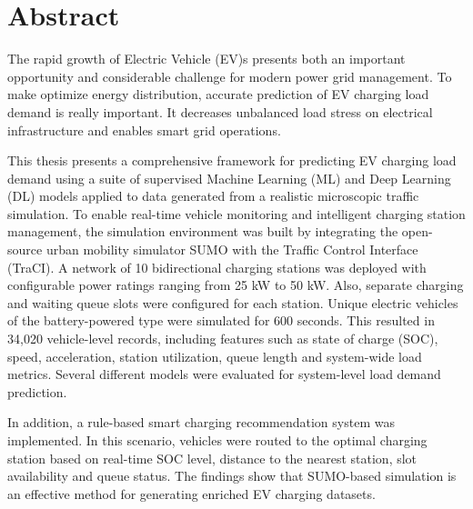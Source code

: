 \documentclass{thesis-library}
\begin{document}
\listofabbreviations

\tableofcontents
\listoffigures
\listoftables

\chapter*{Abstract}

The rapid growth of Electric Vehicle (EV)s presents both an important opportunity and considerable challenge for modern power grid management.
To make optimize energy distribution, accurate prediction of EV charging load demand is really important. It decreases unbalanced load stress on electrical infrastructure and enables smart grid operations. 

This thesis presents a comprehensive framework for predicting EV charging load demand using a suite of supervised Machine Learning (ML) and Deep Learning (DL) models applied to data generated from a realistic microscopic traffic simulation. To enable real-time vehicle monitoring and intelligent charging station management, the simulation environment was built by integrating the open-source urban mobility simulator SUMO with the Traffic Control Interface (TraCI). A network of 10 bidirectional charging stations was deployed with configurable power ratings ranging from 25 kW to 50 kW. Also, separate charging and waiting queue slots were configured for each station. Unique electric vehicles of the battery-powered type were simulated for 600 seconds. This resulted in 34,020 vehicle-level records, including features such as state of charge (SOC), speed, acceleration, station utilization, queue length and system-wide load metrics. Several different models were evaluated for system-level load demand prediction.

In addition, a rule-based smart charging recommendation system was implemented. In this scenario, vehicles were routed to the optimal charging station based on real-time SOC level, distance to the nearest station, slot availability and queue status. The findings show that SUMO-based simulation is an effective method for generating enriched EV charging datasets.
\end{document}
